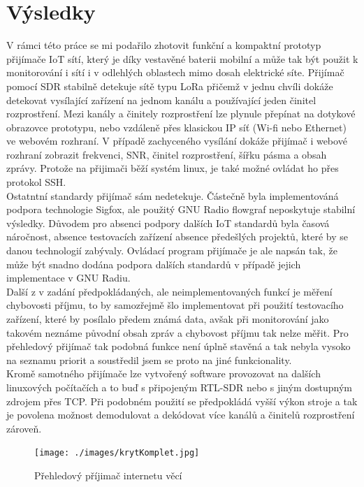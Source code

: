 \documentclass{ctuthesis}
\begin{document}
\section{Výsledky}
V rámci této práce se mi podařilo zhotovit funkční a kompaktní prototyp přijímače IoT sítí, který je díky vestavěné baterii mobilní a může tak být použit k monitorování i sítí i v odlehlých oblastech mimo dosah elektrické síte. Přijímač pomocí SDR stabilně detekuje sítě typu LoRa přičemž v jednu chvíli dokáže detekovat vysílající zařízení na jednom kanálu a používající jeden činitel rozprostření. Mezi kanály a činitely rozprostření lze plynule přepínat na dotykové obrazovce prototypu, nebo vzdáleně přes klasickou IP síť (Wi-fi nebo Ethernet) ve webovém rozhraní. V případě zachyceného vysílání dokáže přijímač i webové rozhraní zobrazit frekvenci, SNR, činitel rozprostření, šířku pásma a obsah zprávy. Protože na přijimači běží systém linux, je také možné ovládat ho přes protokol SSH.\\
Ostatntní standardy přijímač sám nedetekuje. Částečně byla implementováná podpora technologie Sigfox, ale použitý GNU Radio flowgraf neposkytuje stabilní výsledky. Důvodem pro absenci podpory dalších IoT standardů byla časová náročnost, absence testovacích zařízení absence předešlých projektů, které by se danou technologií zabývaly. Ovládací program přijímače je ale napsán tak, že může být snadno dodána podpora dalších standardů v případě jejich implementace v GNU Radiu.\\
Další z v zadání předpokládaných, ale neimplementovaných funkcí je měření chybovosti příjmu, to by samozřejmě šlo implementovat při použití testovacího zařízení, které by posílalo předem známá data, avšak při monitorování jako takovém neznáme původní obsah zpráv a chybovost příjmu tak nelze měřit. Pro přehledový přijímač tak podobná funkce není úplně stavěná a tak nebyla vysoko na seznamu priorit a soustředil jsem se proto na jiné funkcionality.\\
Kromě samotného přijímače lze vytvořený software provozovat na dalších linuxových počítačích a to buď s připojeným RTL-SDR nebo s jiným dostupným zdrojem přes TCP. Při podobném použití se předpokládá vyšší výkon stroje a tak je povolena možnost demodulovat a dekódovat více kanálů a činitelů rozprostření zároveň.

\begin{figure}
\caption{Přehledový příjimač internetu věcí}
\texttt{[image: ./images/krytKomplet.jpg]}
\label{caseKomplet}
\end{figure}
\end{document}
